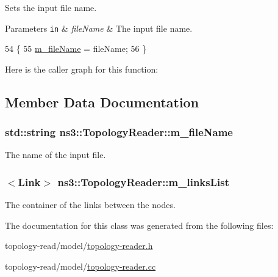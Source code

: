 Sets the input file name. 


\begin{DoxyParams}[1]{Parameters}
\mbox{\tt in}  & {\em file\+Name} & The input file name. \\
\hline
\end{DoxyParams}

\begin{DoxyCode}
54 \{
55   \hyperlink{classns3_1_1TopologyReader_acd9a455842760483301b053c84d59a94}{m\_fileName} = fileName;
56 \}
\end{DoxyCode}


Here is the caller graph for this function\+:




\subsection{Member Data Documentation}
\subsubsection[{\texorpdfstring{m\+\_\+file\+Name}{m_fileName}}]{\setlength{\rightskip}{0pt plus 5cm}std\+::string ns3\+::\+Topology\+Reader\+::m\+\_\+file\+Name\hspace{0.3cm}{\ttfamily [private]}}\hypertarget{classns3_1_1TopologyReader_acd9a455842760483301b053c84d59a94}{}\label{classns3_1_1TopologyReader_acd9a455842760483301b053c84d59a94}
The name of the input file. 
\subsubsection[{\texorpdfstring{m\+\_\+links\+List}{m_linksList}}]{$<${\bf Link}$>$ ns3\+::\+Topology\+Reader\+::m\+\_\+links\+List\hspace{0.3cm}{\ttfamily [private]}}\hypertarget{classns3_1_1TopologyReader_a03a7e3ab363afdb72a0c62bfbd133b08}{}\label{classns3_1_1TopologyReader_a03a7e3ab363afdb72a0c62bfbd133b08}
The container of the links between the nodes. 

The documentation for this class was generated from the following files\+:\begin{DoxyCompactItemize}
\item 
topology-\/read/model/\hyperlink{topology-reader_8h}{topology-\/reader.\+h}\item 
topology-\/read/model/\hyperlink{topology-reader_8cc}{topology-\/reader.\+cc}\end{DoxyCompactItemize}
